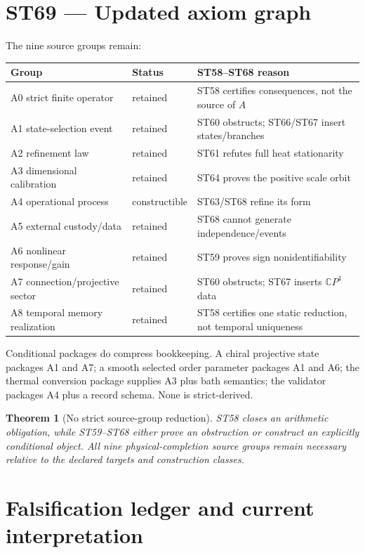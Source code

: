 \documentclass[11pt,a4paper]{article}
\newtheorem{theorem}{Theorem}[section]
\begin{document}
\section{ST69 --- Updated axiom graph}

The nine source groups remain:
\begin{center}
\small
\begin{tabularx}{0.96\textwidth}{@{}l l X@{}}
\toprule
Group & Status & ST58--ST68 reason\\
\midrule
A0 strict finite operator & retained & ST58 certifies consequences, not the source of $A$\\
A1 state-selection event & retained & ST60 obstructs; ST66/ST67 insert states/branches\\
A2 refinement law & retained & ST61 refutes full heat stationarity\\
A3 dimensional calibration & retained & ST64 proves the positive scale orbit\\
A4 operational process & constructible & ST63/ST68 refine its form\\
A5 external custody/data & retained & ST68 cannot generate independence/events\\
A6 nonlinear response/gain & retained & ST59 proves sign nonidentifiability\\
A7 connection/projective sector & retained & ST60 obstructs; ST67 inserts $\mathbb{C}P^1$ data\\
A8 temporal memory realization & retained & ST58 certifies one static reduction, not temporal uniqueness\\
\bottomrule
\end{tabularx}
\end{center}

Conditional packages do compress bookkeeping. A chiral projective state packages A1 and A7; a smooth selected order parameter packages A1 and A6; the thermal conversion package supplies A3 plus bath semantics; the validator packages A4 plus a record schema. None is strict-derived.

\begin{theorem}[No strict source-group reduction]
ST58 closes an arithmetic obligation, while ST59--ST68 either prove an obstruction or construct an explicitly conditional object. All nine physical-completion source groups remain necessary relative to the declared targets and construction classes.
\end{theorem}

\section{Falsification ledger and current interpretation}
\end{document}
